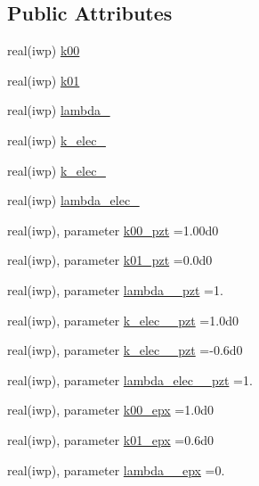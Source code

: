 \subsection*{Public Attributes}
\begin{DoxyCompactItemize}
\item 
real(iwp) \hyperlink{classmaterial__behavior_ac8fb792bd4adb68e0363999ee04ce7ea}{k00}
\item 
real(iwp) \hyperlink{classmaterial__behavior_ae934e25b34ba7c6241ab81a13b9d4d9c}{k01}
\item 
real(iwp) \hyperlink{classmaterial__behavior_a14638f0398619753351d332fbcfa685e}{lambda\+\_}
\item 
real(iwp) \hyperlink{classmaterial__behavior_a73beea5a2807ab8f6e15b990b7592486}{k\+\_\+elec\+\_}
\item 
real(iwp) \hyperlink{classmaterial__behavior_a0ea3e3331e781d97068a80fe41788aaf}{k\+\_\+elec\+\_}
\item 
real(iwp) \hyperlink{classmaterial__behavior_a2ac87e6361866b09f1c027d637477ae7}{lambda\+\_\+elec\+\_}
\item 
real(iwp), parameter \hyperlink{classmaterial__behavior_ac66973ce0f7b60b348a950b3c4df80ed}{k00\+\_\+pzt} =1.\+00d0
\item 
real(iwp), parameter \hyperlink{classmaterial__behavior_a6464410d3cb39865aa5f39b324a30380}{k01\+\_\+pzt} =0.\+0d0
\item 
real(iwp), parameter \hyperlink{classmaterial__behavior_a211dd81ae27709e6027a897a00bc94f8}{lambda\+\_\+\_\+pzt} =1.
\item 
real(iwp), parameter \hyperlink{classmaterial__behavior_a94bfa8bcfa3df70aabe1615a9974c5a1}{k\+\_\+elec\+\_\+\_\+pzt} =1.\+0d0
\item 
real(iwp), parameter \hyperlink{classmaterial__behavior_af2d3155f15083287aaa2bf064b90ca3c}{k\+\_\+elec\+\_\+\_\+pzt} =-\/0.\+6d0
\item 
real(iwp), parameter \hyperlink{classmaterial__behavior_a132fe5a8a83e1e18fa19e3c006520c52}{lambda\+\_\+elec\+\_\+\_\+pzt} =1.
\item 
real(iwp), parameter \hyperlink{classmaterial__behavior_a97caf4b28ab3c5c68ccc7333ab2883f2}{k00\+\_\+epx} =1.\+0d0
\item 
real(iwp), parameter \hyperlink{classmaterial__behavior_a2cdeac845e9ad00ce067bf8d97470328}{k01\+\_\+epx} =0.\+6d0
\item 
real(iwp), parameter \hyperlink{classmaterial__behavior_a3884ad39ef0fb43d355789acc29c8c1a}{lambda\+\_\+\_\+epx} =0.

\end{DoxyCompactItemize}
